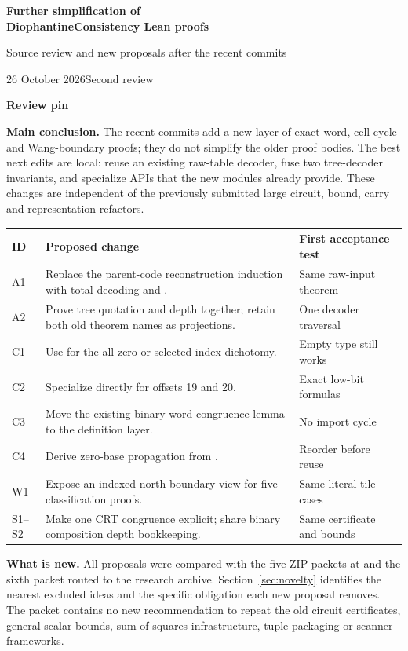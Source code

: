 \thispagestyle{empty}
{\Large\bfseries Further simplification of\\[3pt]
DiophantineConsistency Lean proofs\par}
\vspace{7pt}
{\large Source review and new proposals after the recent commits\par}
\vspace{5pt}
26 October 2026\quad Second review

\textbf{Review pin}\quad{}

\textbf{Main conclusion.} The recent commits add a new layer of exact word,
cell-cycle and Wang-boundary proofs; they do not simplify the older proof
bodies. The best next edits are local: reuse an existing raw-table decoder,
fuse two tree-decoder invariants, and specialize APIs that the new modules
already provide. These changes are independent of the previously submitted
large circuit, bound, carry and representation refactors.

\begin{tabularx}{\linewidth}{@{}L{0.46in}Y L{1.25in}@{}}
\toprule
ID & Proposed change & First acceptance test\\
\midrule
A1 & Replace the parent-code reconstruction induction with total decoding and . & Same raw-input theorem\\
A2 & Prove tree quotation and depth together; retain both old theorem names as projections. & One decoder traversal\\
C1 & Use  for the all-zero or selected-index dichotomy. & Empty type still works\\
C2 & Specialize  directly for offsets 19 and 20. & Exact low-bit formulas\\
C3 & Move the existing binary-word congruence lemma to the definition layer. & No import cycle\\
C4 & Derive zero-base propagation from . & Reorder before reuse\\
W1 & Expose an indexed north-boundary view for five classification proofs. & Same literal tile cases\\
S1--S2 & Make one CRT congruence explicit; share binary composition depth bookkeeping. & Same certificate and bounds\\
\bottomrule
\end{tabularx}

\textbf{What is new.} All proposals were compared with the five ZIP packets
at  and the sixth packet routed to the research archive.
Section~\ref{sec:novelty} identifies the nearest excluded ideas and the
specific obligation each new proposal removes. The packet contains no new
recommendation to repeat the old circuit certificates, general scalar bounds,
sum-of-squares infrastructure, tuple packaging or scanner frameworks.

